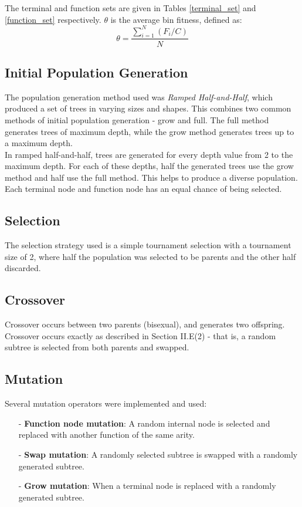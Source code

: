 \documentclass[conference]{IEEEtran}
\begin{document}
The terminal and function sets are given in Tables \ref{terminal_set} and \ref{function_set} respectively. $\theta$ is the average bin fitness, defined as:
\[
  \theta = \frac{\sum_{i=1}^{N}(F_i/C)}{N}
\]

\subsection{Initial Population Generation}
The population generation method used was \textit{Ramped Half-and-Half}, which produced a set of trees in varying sizes and shapes. This combines two common methods of initial population generation - grow and full. The full method generates trees of maximum depth, while the grow method generates trees up to a maximum depth.\\

In ramped half-and-half, trees are generated for every depth value from 2 to the maximum depth. For each of these depths, half the generated trees use the grow method and half use the full method. This helps to produce a diverse population.\\

Each terminal node and function node has an equal chance of being selected.

\subsection{Selection}
The selection strategy used is a simple tournament selection with a tournament size of 2, where half the population was selected to be parents and the other half discarded.

\subsection{Crossover}
Crossover occurs between two parents (bisexual), and generates two offspring. Crossover occurs exactly as described in Section II.E(2) - that is, a random subtree is selected from both parents and swapped.

\subsection{Mutation}
Several mutation operators were implemented and used:
\begin{itemize}
  \item[-] \textbf{Function node mutation}: A random internal node is selected and replaced with another function of the same arity.
  \item[-] \textbf{Swap mutation}: A randomly selected subtree is swapped with a randomly generated subtree.
  \item[-] \textbf{Grow mutation}: When a terminal node is replaced with a randomly generated subtree.\\
\end{itemize}
\end{document}
